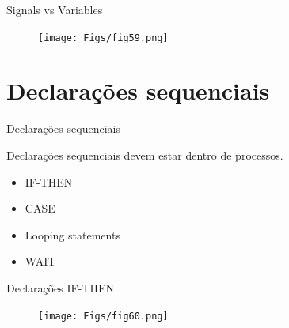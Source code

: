 \documentclass[aspectratio=169]{beamer}
\begin{document}
%	
%	
%	
\begin{frame}{Signals vs Variables}
	\justifying
	
	
	\begin{figure}[h]
		\centering
		\texttt{[image: Figs/fig59.png]}
	\end{figure}
	
\end{frame}
\section{Declarações sequenciais}
\begin{frame}{Declarações sequenciais}
	\justifying
	
	Declarações sequenciais devem estar dentro de processos.
	
	\begin{block}{}
	\begin{itemize}
		\item IF-THEN
		\item CASE 
		\item Looping statements
		\item WAIT
	\end{itemize}
	
	\end{block}		
	
	
	
\end{frame}
\begin{frame}{Declarações IF-THEN}
	\justifying
	
	\begin{figure}[h]
	\centering
	\texttt{[image: Figs/fig60.png]}
	\end{figure}
	
	
	
\end{frame}
\end{document}
